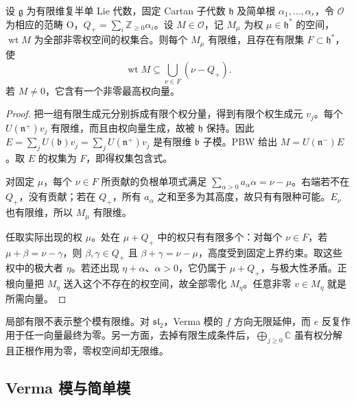 \begin{proposition}\label{b5:prop:o-weight-finiteness}
	设 \(\mathfrak g\) 为有限维复半单 Lie 代数，固定 Cartan 子代数 \(\mathfrak h\) 及简单根 \(\alpha_1,\ldots,\alpha_r\)，令 \(\mathcal O\) 为相应的范畴 O，\(Q_+=\sum_i\mathbb Z_{\ge0}\alpha_i\)。设 \(M\in\mathcal O\)，记 \(M_\mu\) 为权 \(\mu\in\mathfrak h^*\) 的空间，\(\operatorname{wt}M\) 为全部非零权空间的权集合。则每个 \(M_\mu\) 有限维，且存在有限集 \(F\subset\mathfrak h^*\)，使
	\[
		\operatorname{wt}M\subseteq\bigcup_{\nu\in F}(\nu-Q_+).
	\]
	若 \(M\ne0\)，它含有一个非零最高权向量。
\end{proposition}
\begin{proof}
	把一组有限生成元分别拆成有限个权分量，得到有限个权生成元 \(v_j\)。每个 \(U(\mathfrak n^+)v_j\) 有限维，而且由权向量生成，故被 \(\mathfrak h\) 保持。因此 \(E=\sum_jU(\mathfrak b)v_j=\sum_jU(\mathfrak n^+)v_j\) 是有限维 \(\mathfrak b\) 子模。PBW 给出 \(M=U(\mathfrak n^-)E\)。取 \(E\) 的权集为 \(F\)，即得权集包含式。

	对固定 \(\mu\)，每个 \(\nu\in F\) 所贡献的负根单项式满足 \(\sum_{\alpha>0}a_\alpha\alpha=\nu-\mu\)。右端若不在 \(Q_+\)，没有贡献；若在 \(Q_+\)，所有 \(a_\alpha\) 之和至多为其高度，故只有有限种可能。\(E_\nu\) 也有限维，所以 \(M_\mu\) 有限维。

	任取实际出现的权 \(\mu\)。处在 \(\mu+Q_+\) 中的权只有有限多个：对每个 \(\nu\in F\)，若 \(\mu+\beta=\nu-\gamma\)，则 \(\beta,\gamma\in Q_+\) 且 \(\beta+\gamma=\nu-\mu\)，高度受到固定上界约束。取这些权中的极大者 \(\eta\)。若还出现 \(\eta+\alpha\)、\(\alpha>0\)，它仍属于 \(\mu+Q_+\)，与极大性矛盾。正根向量把 \(M_\eta\) 送入这个不存在的权空间，故全部零化 \(M_\eta\)。任意非零 \(v\in M_\eta\) 就是所需向量。
\end{proof}

局部有限不表示整个模有限维。对 \(\mathfrak{sl}_2\)，Verma 模的 \(f\) 方向无限延伸，而 \(e\) 反复作用于任一向量最终为零。另一方面，去掉有限生成条件后，\(\bigoplus_{j\ge0}\mathbb C\) 虽有权分解且正根作用为零，零权空间却无限维。

\subsection{Verma 模与简单模}
\label{b5:subsec:2001:02}

